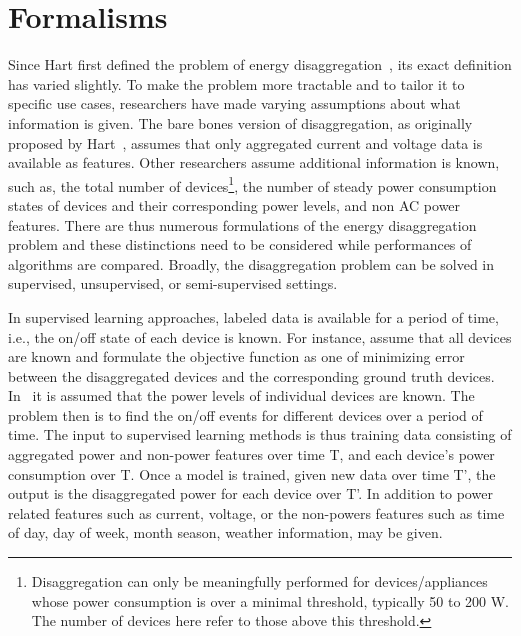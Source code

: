 \section{Formalisms}
\label{sec:problem}


Since Hart first defined the problem of energy disaggregation~\cite{hart1992}, its
exact definition has varied slightly. To make the problem more tractable and to
tailor it to specific use cases, researchers have made varying assumptions
about what information is given.
The bare bones version of disaggregation, as originally proposed
by Hart~\cite{hart1992}, assumes that only
aggregated current and voltage data is available as features. Other
researchers assume additional information is known, such as, 
the total number of devices\footnote{Disaggregation can only be meaningfully
  performed for devices/appliances whose power consumption is over a minimal
  threshold, typically 50 to 200 W. The number of devices here refer to those above this
  threshold.}, the number of steady power consumption states of 
devices and their corresponding power levels, and non AC power features. 
There are thus numerous formulations of the energy disaggregation problem and
these distinctions need to be considered while performances of
algorithms are compared. 
Broadly, the disaggregation problem can be solved in supervised,
unsupervised, or semi-supervised settings.

In supervised learning approaches, labeled data is available for a period of
time, i.e., the on/off state of each device is known. 
For instance, \cite{liang2010load} assume that all devices are known
and formulate the objective function as one of 
minimizing error between the disaggregated devices and 
the corresponding ground truth devices. 
In~\cite{kolter2012aistat} it is
assumed that the power levels of individual devices are known. 
The problem then is to find the on/off events
for different devices over a period of time.
The input to supervised learning methods is thus training data consisting of
aggregated power and non-power features over time T, and each device's power
consumption over T.
Once a model is trained, given new data over
time T', the output is the disaggregated power for each device over T'.
In addition to 
power related features such as current, voltage, 
or the non-powers features such as time of day, day of week, month season,
weather information, may be given. 


